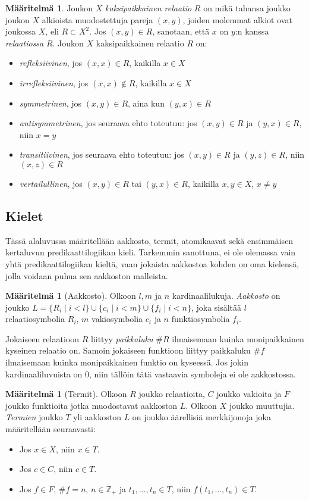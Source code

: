 \documentclass[finnish]{tktltiki2}
\theoremstyle{definition}
\newtheorem{maar}[lau]{Määritelmä}
\theoremstyle{remark}
\begin{document}
\begin{maar}
Joukon $X$ \textit{kaksipaikkainen relaatio} $R$ on mikä tahansa joukko joukon $X$ alkioista muodostettuja pareja $(x, y)$, joiden molemmat alkiot ovat joukossa $X$, eli $R \subset X^2$.  Jos $(x, y) \in R$, sanotaan, että $x$ on $y$:n kanssa \textit{relaatiossa} $R$. Joukon $X$ kaksipaikkainen relaatio $R$ on:
\begin{itemize}
\item \textit{refleksiivinen}, jos $(x, x) \in R$, kaikilla $x \in X$
\item \textit{irrefleksiivinen}, jos $(x, x) \notin R$, kaikilla $x \in X$
\item \textit{symmetrinen}, jos $(x, y) \in R$, aina kun $(y, x) \in R$
\item \textit{antisymmetrinen}, jos seuraava ehto toteutuu: jos $(x, y) \in R$ ja $(y, x) \in R$, niin $x = y$
\item \textit{transitiivinen}, jos seuraava ehto toteutuu: jos $(x, y) \in R$ ja $(y, z) \in R$, niin $(x, z) \in R$
\item \textit{vertailullinen}, jos $(x, y) \in R$ tai $(y, x) \in R$, kaikilla $x, y \in X$, $x \neq y$
\end{itemize}
\end{maar}

\subsection{Kielet}
Tässä alaluvussa määritellään aakkosto, termit, atomikaavat sekä ensimmäisen kertaluvun predikaattilogiikan kieli. Tarkemmin sanottuna, ei ole olemassa vain yhtä predikaattilogiikan kieltä, vaan jokaista aakkostoa kohden on oma kielensä, jolla voidaan puhua sen aakkoston malleista.

\begin{maar}[Aakkosto]
Olkoon $l, m$ ja $n$ kardinaalilukuja. \textit{Aakkosto} on joukko $L = \{R_i \mid i < l\} \cup \{c_i \mid i < m\} \cup \{f_i \mid i < n\}$, joka sisältää $l$ relaatiosymbolia $R_i$, $m$ vakiosymbolia $c_i$ ja $n$ funktiosymbolia $f_i$.
\end{maar}
Jokaiseen relaatioon $R$ liittyy \textit{paikkaluku} $\#R$ ilmaisemaan kuinka monipaikkainen kyseinen relaatio on. Samoin jokaiseen funktioon liittyy paikkaluku $\#f$ ilmaisemaan kuinka monipaikkainen funktio on kyseessä. Jos jokin kardinaaliluvuista on $0$, niin tällöin tätä vastaavia symboleja ei ole aakkostossa.

\begin{maar}[Termit]
Olkoon $R$ joukko relaatioita, $C$ joukko vakioita ja $F$ joukko funktioita jotka muodostavat aakkoston $L$. Olkoon $X$ joukko muuttujia. \textit{Termien} joukko $T$ yli aakkoston $L$ on joukko äärellisiä merkkijonoja joka määritellään seuraavasti:
\begin{itemize}
\item Jos $x \in X$, niin $x \in T$.
\item Jos $c \in C$, niin $c \in T$.
\item Jos $f \in F$, $\#f = n$, $n\in \mathbb{Z}_+$ ja $t_1, \ldots, t_n \in T$, niin $f(t_1, \ldots, t_n) \in T$.
\end{itemize}
\end{maar}
\end{document}
